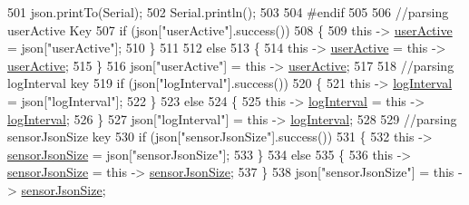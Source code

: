 \begin{DoxyCode}
501             json.printTo(Serial);
502             Serial.println();
503         
504 \textcolor{preprocessor}{        #endif}
505             
506             \textcolor{comment}{//parsing userActive Key}
507             \textcolor{keywordflow}{if} (json[\textcolor{stringliteral}{"userActive"}].success())
508             \{
509                 \textcolor{keyword}{this} -> \hyperlink{classCoolBoard_a6395459131d6889a3005f79c7a35e964}{userActive} = json[\textcolor{stringliteral}{"userActive"}];
510             \}
511 
512             \textcolor{keywordflow}{else}
513             \{
514                 \textcolor{keyword}{this} -> \hyperlink{classCoolBoard_a6395459131d6889a3005f79c7a35e964}{userActive} = \textcolor{keyword}{this} -> \hyperlink{classCoolBoard_a6395459131d6889a3005f79c7a35e964}{userActive};
515             \}
516             json[\textcolor{stringliteral}{"userActive"}] = \textcolor{keyword}{this} -> \hyperlink{classCoolBoard_a6395459131d6889a3005f79c7a35e964}{userActive};
517 
518             \textcolor{comment}{//parsing logInterval key}
519             \textcolor{keywordflow}{if} (json[\textcolor{stringliteral}{"logInterval"}].success())
520             \{
521                 \textcolor{keyword}{this} -> \hyperlink{classCoolBoard_a4de0096d575d66b472c4c1f0111fd452}{logInterval} = json[\textcolor{stringliteral}{"logInterval"}];
522             \}
523             \textcolor{keywordflow}{else}
524             \{
525                 \textcolor{keyword}{this} -> \hyperlink{classCoolBoard_a4de0096d575d66b472c4c1f0111fd452}{logInterval} = \textcolor{keyword}{this} -> \hyperlink{classCoolBoard_a4de0096d575d66b472c4c1f0111fd452}{logInterval};
526             \}
527             json[\textcolor{stringliteral}{"logInterval"}] = \textcolor{keyword}{this} -> \hyperlink{classCoolBoard_a4de0096d575d66b472c4c1f0111fd452}{logInterval};
528 
529             \textcolor{comment}{//parsing sensorJsonSize key}
530             \textcolor{keywordflow}{if} (json[\textcolor{stringliteral}{"sensorJsonSize"}].success())
531             \{
532                 \textcolor{keyword}{this} -> \hyperlink{classCoolBoard_a58e4b6072e3ac8b141ec0befb479208e}{sensorJsonSize} = json[\textcolor{stringliteral}{"sensorJsonSize"}];
533             \}
534             \textcolor{keywordflow}{else}
535             \{
536                 \textcolor{keyword}{this} -> \hyperlink{classCoolBoard_a58e4b6072e3ac8b141ec0befb479208e}{sensorJsonSize} = \textcolor{keyword}{this} -> \hyperlink{classCoolBoard_a58e4b6072e3ac8b141ec0befb479208e}{sensorJsonSize};
537             \}
538             json[\textcolor{stringliteral}{"sensorJsonSize"}] = \textcolor{keyword}{this} -> \hyperlink{classCoolBoard_a58e4b6072e3ac8b141ec0befb479208e}{sensorJsonSize};

\end{DoxyCode}
